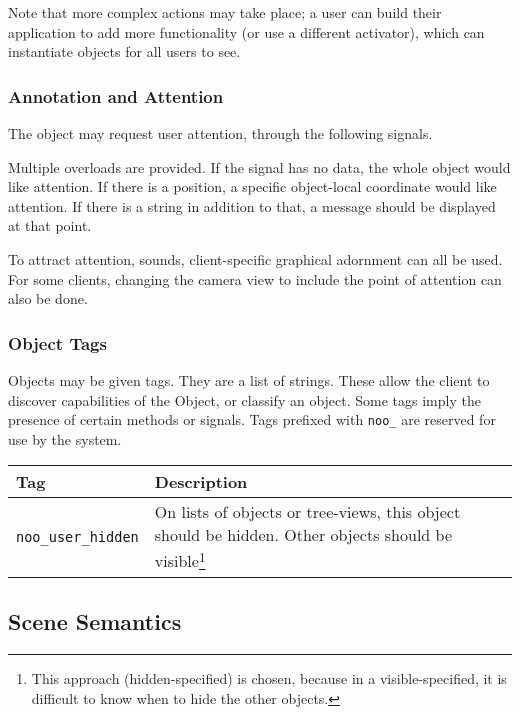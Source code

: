 \documentclass[11pt, oneside]{amsart}
\begin{document}
Note that more complex actions may take place; a user can build their application to add more functionality (or use a different activator), which can instantiate objects for all users to see.

\subsubsection{Annotation and Attention}

The object may request user attention, through the following signals.



Multiple overloads are provided. If the signal has no data, the whole object would like attention. If there is a position, a specific object-local coordinate would like attention. If there is a string in addition to that, a message should be displayed at that point.

To attract attention, sounds, client-specific graphical adornment can all be used. For some clients, changing the camera view to include the point of attention can also be done.

\subsubsection{Object Tags}

Objects may be given tags. They are a list of strings. These allow the client to discover capabilities of the Object, or classify an object. Some tags imply the presence of certain methods or signals. Tags prefixed with \texttt{noo\_} are reserved for use by the system.

\begin{tabularx}{.9\textwidth}{p{1.5in}X}
	\toprule
	\textbf{Tag} & \textbf{Description} \\
	\midrule
	\texttt{noo\_user\_hidden} & On lists of objects or tree-views, this object should be hidden. Other objects should be visible\footnote{This approach (hidden-specified) is chosen, because in a visible-specified, it is difficult to know when to hide the other objects.} \\
	\bottomrule
\end{tabularx}

\subsection{Scene Semantics}
\end{document}
